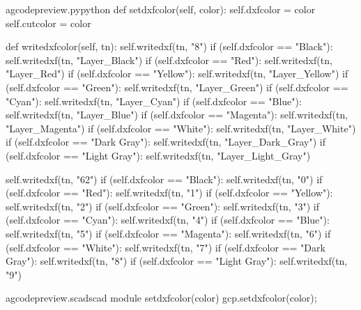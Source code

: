 \documentclass{ltxdoc}
\begin{document}
\lstset{firstnumber=\thegcpy}
\begin{writecode}{a}{gcodepreview.py}{python}
    def setdxfcolor(self, color):
        self.dxfcolor = color
        self.cutcolor = color

    def writedxfcolor(self, tn):
            self.writedxf(tn, "8")
            if (self.dxfcolor == "Black"):
                self.writedxf(tn, "Layer_Black")
            if (self.dxfcolor == "Red"):
                self.writedxf(tn, "Layer_Red")
            if (self.dxfcolor == "Yellow"):
                self.writedxf(tn, "Layer_Yellow")
            if (self.dxfcolor == "Green"):
                self.writedxf(tn, "Layer_Green")
            if (self.dxfcolor == "Cyan"):
                self.writedxf(tn, "Layer_Cyan")
            if (self.dxfcolor == "Blue"):
                self.writedxf(tn, "Layer_Blue")
            if (self.dxfcolor == "Magenta"):
                self.writedxf(tn, "Layer_Magenta")
            if (self.dxfcolor == "White"):
                self.writedxf(tn, "Layer_White")
            if (self.dxfcolor == "Dark Gray"):
                self.writedxf(tn, "Layer_Dark_Gray")
            if (self.dxfcolor == "Light Gray"):
                self.writedxf(tn, "Layer_Light_Gray")

            self.writedxf(tn, "62")
            if (self.dxfcolor == "Black"):
                self.writedxf(tn, "0")
            if (self.dxfcolor == "Red"):
                self.writedxf(tn, "1")
            if (self.dxfcolor == "Yellow"):
                self.writedxf(tn, "2")
            if (self.dxfcolor == "Green"):
                self.writedxf(tn, "3")
            if (self.dxfcolor == "Cyan"):
                self.writedxf(tn, "4")
            if (self.dxfcolor == "Blue"):
                self.writedxf(tn, "5")
            if (self.dxfcolor == "Magenta"):
                self.writedxf(tn, "6")
            if (self.dxfcolor == "White"):
                self.writedxf(tn, "7")
            if (self.dxfcolor == "Dark Gray"):
                self.writedxf(tn, "8")
            if (self.dxfcolor == "Light Gray"):
                self.writedxf(tn, "9")

\end{writecode}
\addtocounter{gcpy}{49}

\lstset{firstnumber=\thegcpscad}
\begin{writecode}{a}{gcodepreview.scad}{scad}
module setdxfcolor(color){
    gcp.setdxfcolor(color);
}

\end{writecode}
\addtocounter{gcpscad}{4}
\end{document}
